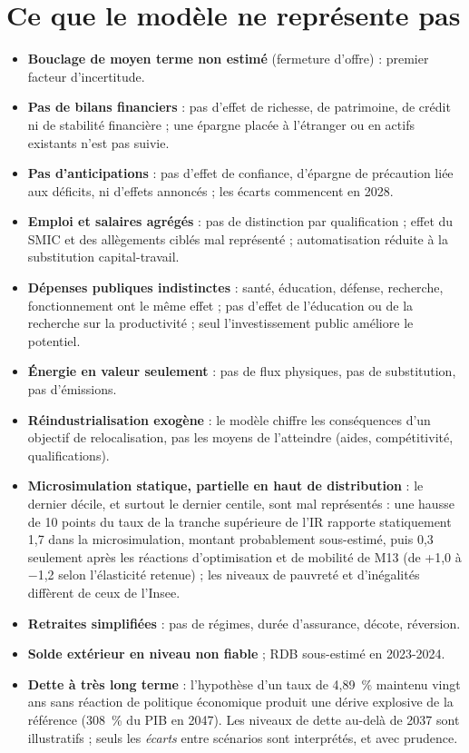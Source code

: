 \section{Ce que le modèle ne représente pas}
\label{sec:audit-manques}

\begin{limites}
\begin{itemize}
\item \textbf{Bouclage de moyen terme non estimé} (fermeture d'offre) : premier facteur d'incertitude.
\item \textbf{Pas de bilans financiers} : pas d'effet de richesse, de patrimoine, de crédit ni de stabilité financière ;
une épargne placée à l'étranger ou en actifs existants n'est pas suivie.
\item \textbf{Pas d'anticipations} : pas d'effet de confiance, d'épargne de précaution liée aux déficits, ni d'effets
annoncés ; les écarts commencent en 2028.
\item \textbf{Emploi et salaires agrégés} : pas de distinction par qualification ; effet du SMIC et des allègements
ciblés mal représenté ; automatisation réduite à la substitution capital-travail.
\item \textbf{Dépenses publiques indistinctes} : santé, éducation, défense, recherche, fonctionnement ont le même effet ;
pas d'effet de l'éducation ou de la recherche sur la productivité ; seul l'investissement public améliore le potentiel.
\item \textbf{Énergie en valeur seulement} : pas de flux physiques, pas de substitution, pas d'émissions.
\item \textbf{Réindustrialisation exogène} : le modèle chiffre les conséquences d'un objectif de relocalisation, pas les
moyens de l'atteindre (aides, compétitivité, qualifications).
\item \textbf{Microsimulation statique, partielle en haut de distribution} : le dernier décile, et surtout le dernier
centile, sont mal représentés : une hausse de 10 points du taux de la tranche supérieure de l'IR rapporte
statiquement 1,7\md{} dans la microsimulation, montant probablement sous-estimé, puis 0,3\md{} seulement après les
réactions d'optimisation et de mobilité de M13 (de +1,0\md{} à $-$1,2\md{} selon l'élasticité retenue) ; les niveaux
de pauvreté et d'inégalités diffèrent de ceux de l'Insee.
\item \textbf{Retraites simplifiées} : pas de régimes, durée d'assurance, décote, réversion.
\item \textbf{Solde extérieur en niveau non fiable} ; RDB sous-estimé en 2023-2024.
\item \textbf{Dette à très long terme} : l'hypothèse d'un taux de 4,89~\% maintenu vingt ans sans réaction de
politique économique produit une dérive explosive de la référence (308~\% du PIB en 2047). Les niveaux de dette au-delà
de 2037 sont illustratifs ; seuls les \emph{écarts} entre scénarios sont interprétés, et avec prudence.
\end{itemize}
\end{limites}
